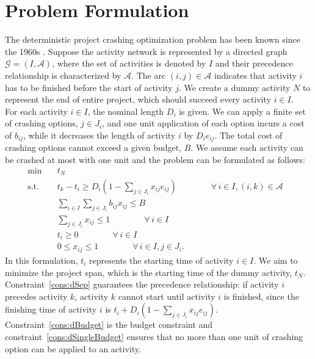 \documentclass[11pt]{article}
\begin{document}
\section{Problem Formulation} \label{sec:formulation}
	The deterministic project crashing optimization problem has been known since the 1960s \cite{fulkerson1961network, kelley1961criticalpath}. Suppose the activity network is represented by a directed graph \(\mathcal{G} = (I,\mathcal{A})\), where the set of activities is denoted by \(I\) and their precedence relationship is characterized by \(\mathcal{A}\). The arc \((i,j) \in \mathcal{A}\) indicates that activity \(i\) has to be finished before the start of activity \(j\). We create a dummy activity \(N\) to represent the end of entire project, which should succeed every activity \(i \in I\). \\
	\newline
	For each activity \(i \in I\), the nominal length \(D_i\) is given. We can apply a finite set of crashing options, \(j \in J_i\), and one unit application of each option incurs a cost of \(b_{ij}\), while it decreases the length of activity \(i\) by \(D_ie_{ij}\). The total cost of crashing options cannot exceed a given budget, \(B\). We assume each activity can be crashed at most with one unit and the problem can be formulated as follows:
	\begin{subequations} \label{prob2:static}
		\begin{align}
		\min \quad & t_N &\\
		\text{s.t.} \quad &  t_k - t_i \geq D_{i}(1 - \sum_{j \in J_i} x_{ij} e_{ij}) \qquad \qquad \forall \,i \in I, (i,k) \in \mathcal{A} \label{cons:dSep}\\
		& \sum_{i \in I} \sum_{j \in J_i} b_{ij}x_{ij} \leq B  \label{cons:dBudget}\\
		& \sum_{j \in J_i} x_{ij} \leq 1  \qquad \qquad \forall \,i \in I \label{cons:dSingleBudget}\\
		& t_i \geq 0  \qquad \qquad \forall \,i \in I\\
		& 0 \leq x_{ij} \leq 1  \qquad \qquad \forall \,i \in I, j \in J_i.
		\end{align}
	\end{subequations}
	In this formulation, \(t_i\) represents the starting time of activity \(i \in I\). We aim to minimize the project span, which is the starting time of the dummy activity, \(t_N\). Constraint~\eqref{cons:dSep} guarantees the precedence relationship: if activity \(i\) precedes activity \(k\), activity \(k\) cannot start until activity \(i\) is finished, since the finishing time of activity \(i\) is \(t_i + D_i (1- \sum_{j \in J_i} x_{ij}e_{ij})\). Constraint~\eqref{cons:dBudget} is the budget constraint and constraint~\eqref{cons:dSingleBudget} ensures that no more than one unit of crashing option can be applied to an activity. \\
\end{document}
